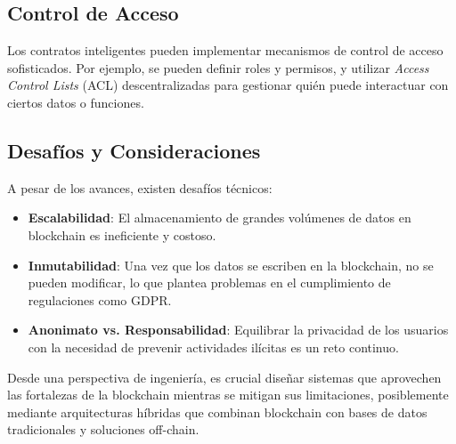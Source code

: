 \subsection{Control de Acceso}

Los contratos inteligentes pueden implementar mecanismos de control de acceso sofisticados. Por ejemplo, se pueden definir roles y permisos, y utilizar \textit{Access Control Lists} (ACL) descentralizadas para gestionar quién puede interactuar con ciertos datos o funciones.

\subsection{Desafíos y Consideraciones}

A pesar de los avances, existen desafíos técnicos:

\begin{itemize}
    \item \textbf{Escalabilidad}: El almacenamiento de grandes volúmenes de datos en blockchain es ineficiente y costoso.
    \item \textbf{Inmutabilidad}: Una vez que los datos se escriben en la blockchain, no se pueden modificar, lo que plantea problemas en el cumplimiento de regulaciones como GDPR.
    \item \textbf{Anonimato vs. Responsabilidad}: Equilibrar la privacidad de los usuarios con la necesidad de prevenir actividades ilícitas es un reto continuo.
\end{itemize}

Desde una perspectiva de ingeniería, es crucial diseñar sistemas que aprovechen las fortalezas de la blockchain mientras se mitigan sus limitaciones, posiblemente mediante arquitecturas híbridas que combinan blockchain con bases de datos tradicionales y soluciones off-chain.

